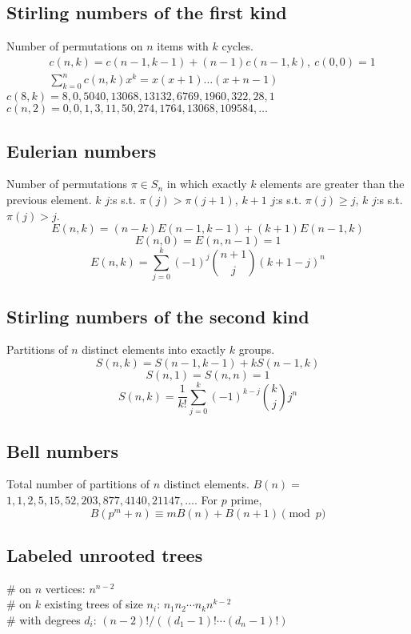 \documentclass{article}
\begin{document}
	\subsection{Stirling numbers of the first kind}
		Number of permutations on $n$ items with $k$ cycles.
		\begin{align*}
			&c(n,k) = c(n-1,k-1) + (n-1) c(n-1,k),\ c(0,0) = 1 \\
			&\textstyle \sum_{k=0}^n c(n,k)x^k = x(x+1) \dots (x+n-1)
		\end{align*}
		$c(8,k) = 8, 0, 5040, 13068, 13132, 6769, 1960, 322, 28, 1$ \\
		$c(n,2) = 0, 0, 1, 3, 11, 50, 274, 1764, 13068, 109584, \dots$

	\subsection{Eulerian numbers}
		Number of permutations $\pi \in S_n$ in which exactly $k$ elements are greater than the previous element. $k$ $j$:s s.t. $\pi(j)>\pi(j+1)$, $k+1$ $j$:s s.t. $\pi(j)\geq j$, $k$ $j$:s s.t. $\pi(j)>j$.
		$$E(n,k) = (n-k)E(n-1,k-1) + (k+1)E(n-1,k)$$
		$$E(n,0) = E(n,n-1) = 1$$
		$$E(n,k) = \sum_{j=0}^k(-1)^j\binom{n+1}{j}(k+1-j)^n$$

	\subsection{Stirling numbers of the second kind}
		Partitions of $n$ distinct elements into exactly $k$ groups.
		$$S(n,k) = S(n-1,k-1) + k S(n-1,k)$$
		$$S(n,1) = S(n,n) = 1$$
		$$S(n,k) = \frac{1}{k!}\sum_{j=0}^k (-1)^{k-j}\binom{k}{j}j^n$$

	\subsection{Bell numbers}
		Total number of partitions of $n$ distinct elements. $B(n) =$
		$1, 1, 2, 5, 15, 52, 203, 877, 4140, 21147, \dots$. For $p$ prime,
		\[ B(p^m+n)\equiv mB(n)+B(n+1) \pmod{p} \]

	\subsection{Labeled unrooted trees}
		\# on $n$ vertices: $n^{n-2}$ \\
		\# on $k$ existing trees of size $n_i$: $n_1n_2\cdots n_k n^{k-2}$ \\
		\# with degrees $d_i$: $(n-2)! / ((d_1-1)! \cdots (d_n-1)!)$
\end{document}
